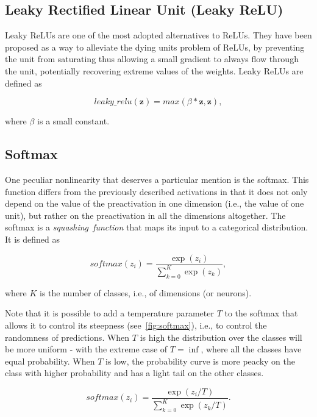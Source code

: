 \subsection{Leaky Rectified Linear Unit (Leaky ReLU)}\label{sec:lrelu}
Leaky ReLUs are one of the most adopted alternatives to ReLUs. They have been
proposed as a way to alleviate the dying units problem of ReLUs, by preventing
the unit from saturating thus allowing a small gradient to always flow through
the unit, potentially recovering extreme values of the weights. Leaky ReLUs are
defined as

\begin{equation}\label{eq:lrelu}
    leaky\_relu(\mathbf{z}) = max(\beta*\mathbf{z}, \mathbf{z}),
\end{equation}

\noindent where $\beta$ is a small constant.

\subsection{Softmax}\label{sec:softmax}
One peculiar nonlinearity that deserves a particular mention is the softmax.
This function differs from the previously described activations in that it
does not only depend on the value of the preactivation in one dimension (i.e.,
the value of one unit), but rather on the preactivation in all the dimensions
altogether. The softmax is a \emph{squashing~function} that maps its input to a
categorical distribution. It is defined as

\begin{equation}\label{eq:softmax}
    softmax(z_i) = \frac{\exp(z_i)}{\sum_{k=0}^K{\exp(z_k)}},
\end{equation}

\noindent where $K$ is the number of classes, i.e., of dimensions (or neurons).

Note that it is possible to add a temperature parameter $T$ to the softmax that
allows it to control its steepness (see~\ref{fig:softmax}), i.e., to
control the randomness of predictions. When $T$ is high the distribution over
the classes will be more uniform - with the extreme case of $T = \inf$, where
all the classes have equal probability. When $T$ is low, the probability curve
is more peacky on the class with higher probability and has a light tail on the
other classes.

\begin{equation}\label{eq:softmax_tmp}
    softmax(z_i) = \frac{\exp(z_i / T)}
                        {\sum_{k=0}^K{\exp(z_k / T)}}.
\end{equation}

